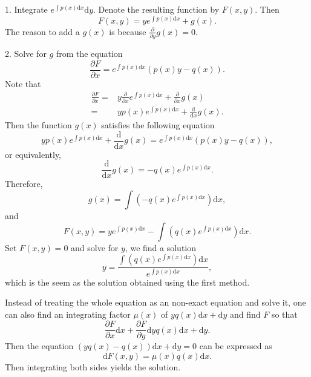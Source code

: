 \begin{subappendices}
1. Integrate $e^{\int p(x)\mathrm{d}x} \mathrm{d} y$. Denote the resulting function by $F(x, y)$. Then
    $$F(x, y)=ye^{\int p(x)\mathrm{d}x} + g(x).$$ The reason to add a $g(x)$ is because $\frac{\partial}{\partial y}g(x)=0$.

2. Solve for $g$ from the equation
    $$\frac{\partial F}{\partial x}=e^{\int p(x)\mathrm{d}x}(p(x)y-q(x)).$$
    Note that
    $$
    \begin{aligned}
    \frac{\partial F}{\partial x}=&y\frac{\partial}{\partial x}e^{\int p(x)\mathrm{d} x}+\frac{\partial}{\partial x}g(x)\\
    =&yp(x)e^{\int p(x)\mathrm{d} x}+\frac{\mathrm{d}}{\mathrm{d} x}g(x).
    \end{aligned}
    $$
  Then the function $g(x)$ satisfies the following equation
  $$yp(x)e^{\int p(x)\mathrm{d} x}+\frac{\mathrm{d}}{\mathrm{d} x}g(x)=e^{\int p(x)\mathrm{d}x}(p(x)y-q(x)),$$
  or equivalently,
  $$\frac{\mathrm{d}}{\mathrm{d} x}g(x)=-q(x)e^{\int p(x)\mathrm{d}x}.$$
  Therefore,
  $$g(x)=\int\left(-q(x)e^{\int p(x)\mathrm{d}x}\right)\mathrm{d}x,$$
  and
  $$F(x, y)=ye^{\int p(x)\mathrm{d}x}-\int\left(q(x)e^{\int p(x)\mathrm{d}x}\right)\mathrm{d}x.$$
  Set $F(x, y)=0$ and solve for $y$, we find a solution
  $$y=\dfrac{\int\left(q(x)e^{\int p(x)\mathrm{d}x}\right)\mathrm{d}x}{e^{\int p(x)\mathrm{d}x}},$$
  which is the seem as the solution obtained using the first method.

\begin{remark}
Instead of treating the whole equation as an non-exact equation and solve it, one can also find an integrating factor $\mu(x)$ of $yq(x)\mathrm{d} x + \mathrm{d} y$ and find $F$ so that
$$\frac{\partial F}{\partial x}\mathrm{d} x + \frac{\partial F}{\partial y}\mathrm{d} yq(x)\mathrm{d} x + \mathrm{d} y.$$
Then the equation $(yq(x)-q(x))\mathrm{d} x + \mathrm{d} y=0$ can be expressed as
$$\mathrm{d} F(x, y)=\mu(x)q(x)\mathrm{d} x.$$
Then integrating both sides yields the solution.
\end{remark}

\end{subappendices}